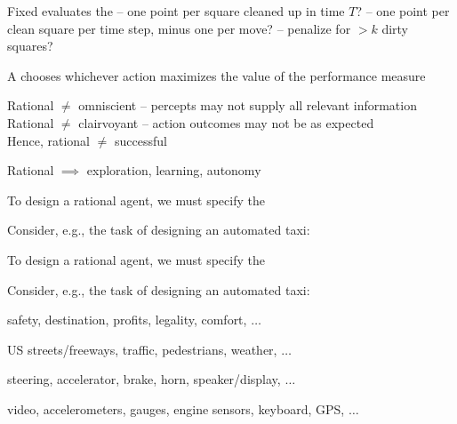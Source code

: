 \documentclass{article}
\begin{document}
\begin{huge}

Fixed  evaluates the \al
-- one point per square cleaned up in time $T$?\al
-- one point per clean square per time step, minus one per move?\al
-- penalize for ${}> k$ dirty squares?

A  chooses whichever action maximizes the  value of
the performance measure 

Rational $\neq$ omniscient\nl
   -- percepts may not supply all relevant information\\
Rational $\neq$ clairvoyant\nl
   -- action outcomes may not be as expected\\
Hence, rational $\neq$ successful

Rational $\implies$ exploration, learning, autonomy





To design a rational agent, we must specify the 

Consider, e.g., the task of designing an automated taxi:







To design a rational agent, we must specify the 

Consider, e.g., the task of designing an automated taxi:

 safety, destination, profits, legality, comfort, $\ldots$

 US streets/freeways, traffic, pedestrians, weather, $\ldots$

 steering, accelerator, brake, horn, speaker/display, $\ldots$

 video, accelerometers, gauges, engine sensors, keyboard, GPS, $\ldots$




\end{huge}
\end{document}
